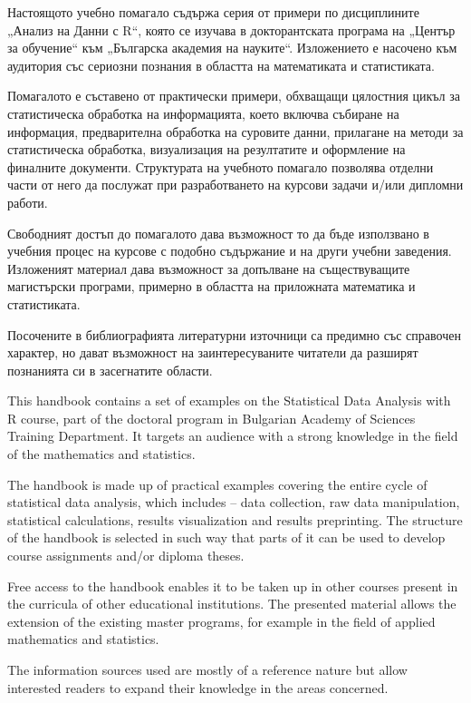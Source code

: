 ﻿Настоящото учебно помагало съдържа серия от примери по дисциплините „Анализ на Данни с R“, която се изучава в докторантската програма на „Център за обучение“ към „Българска академия на науките“. Изложението е насочено към аудитория със сериозни познания в областта на математиката и статистиката. 

Помагалото е съставено от практически примери, обхващащи цялостния цикъл за статистическа обработка на информацията, което включва събиране на информация, предварителна обработка на суровите данни, прилагане на методи за статистическа обработка, визуализация на резултатите и оформление на финалните документи. Структурата на учебното помагало позволява отделни части от него да послужат при разработването на курсови задачи и/или дипломни работи.

Свободният достъп до помагалото дава възможност то да бъде използвано в учебния процес на курсове с подобно съдържание и на други учебни заведения. Изложеният материал дава възможност за допълване на съществуващите магистърски програми, примерно в областта на приложната математика и статистиката.

Посочените в библиографията литературни източници са предимно със справочен характер, но дават възможност на заинтересуваните читатели да разширят познанията си в засегнатите области. 

This handbook contains a set of examples on the Statistical Data Analysis with R course, part of the doctoral program in Bulgarian Academy of Sciences Training Department. It targets an audience with a strong knowledge in the field of the mathematics and statistics.

The handbook is made up of practical examples covering the entire cycle of statistical data analysis, which includes – data collection, raw data manipulation, statistical calculations, results visualization and results preprinting. The structure of the handbook is selected in such way that parts of it can be used to develop course assignments and/or diploma theses.

Free access to the handbook enables it to be taken up in other courses present in the curricula of other educational institutions. The presented material allows the extension of the existing master programs, for example in the field of applied mathematics and statistics.

The information sources used are mostly of a reference nature but allow interested readers to expand their knowledge in the areas concerned.

